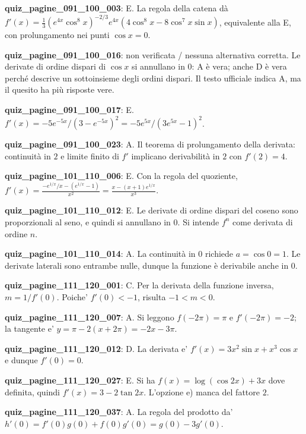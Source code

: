 \documentclass[11pt,a4paper]{article}
\newcounter{quiz}
\begin{document}
\noindent\textbf{quiz\_pagine\_091\_100\_003}: E. La regola della catena dà $f\prime(x)=\frac13(e^{4x}\cos^8x)^{-2/3}e^{4x}(4\cos^8x-8\cos^7x\sin x)$, equivalente alla E, con prolungamento nei punti $\cos x=0$.\par\medskip
\noindent\textbf{quiz\_pagine\_091\_100\_016}: non verificata / nessuna alternativa corretta. Le derivate di ordine dispari di $\cos x$ si annullano in $0$: A è vera; anche D è vera perché descrive un sottoinsieme degli ordini dispari. Il testo ufficiale indica A, ma il quesito ha più risposte vere.\par\medskip
\noindent\textbf{quiz\_pagine\_091\_100\_017}: E. $f\prime(x)=-5e^{-5x}/(3-e^{-5x})^2=-5e^{5x}/(3e^{5x}-1)^2$.\par\medskip
\noindent\textbf{quiz\_pagine\_091\_100\_023}: A. Il teorema di prolungamento della derivata: continuità in $2$ e limite finito di $f\prime$ implicano derivabilità in $2$ con $f\prime(2)=4$.\par\medskip
\noindent\textbf{quiz\_pagine\_101\_110\_006}: E. Con la regola del quoziente, $f\prime(x)=\frac{-e^{1/x}/x- (e^{1/x}-1)}{x^2}=\frac{x-(x+1)e^{1/x}}{x^3}$.\par\medskip
\noindent\textbf{quiz\_pagine\_101\_110\_012}: E. Le derivate di ordine dispari del coseno sono proporzionali al seno, e quindi si annullano in $0$. Si intende $f^n$ come derivata di ordine $n$.\par\medskip
\noindent\textbf{quiz\_pagine\_101\_110\_014}: A. La continuità in $0$ richiede $a=\cos0=1$. Le derivate laterali sono entrambe nulle, dunque la funzione è derivabile anche in $0$.\par\medskip
\noindent\textbf{quiz\_pagine\_111\_120\_001}: C. Per la derivata della funzione inversa, $m=1/f'(0)$. Poiche' $f'(0)<-1$, risulta $-1<m<0$.\par\medskip
\noindent\textbf{quiz\_pagine\_111\_120\_007}: A. Si leggono $f(-2\pi)=\pi$ e $f'(-2\pi)=-2$; la tangente e' $y=\pi-2(x+2\pi)=-2x-3\pi$.\par\medskip
\noindent\textbf{quiz\_pagine\_111\_120\_012}: D. La derivata e' $f'(x)=3x^2\sin x+x^3\cos x$ e dunque $f'(0)=0$.\par\medskip
\noindent\textbf{quiz\_pagine\_111\_120\_027}: E. Si ha $f(x)=\log(\cos2x)+3x$ dove definita, quindi $f'(x)=3-2\tan2x$. L'opzione e) manca del fattore $2$.\par\medskip
\noindent\textbf{quiz\_pagine\_111\_120\_037}: A. La regola del prodotto da' $h'(0)=f'(0)g(0)+f(0)g'(0)=g(0)-3g'(0)$.\par\medskip
\end{document}
